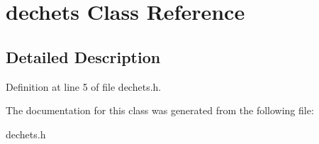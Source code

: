 \hypertarget{classdechets}{}\section{dechets Class Reference}
\label{classdechets}


\subsection{Detailed Description}


Definition at line 5 of file dechets.\+h.



The documentation for this class was generated from the following file\+:\begin{DoxyCompactItemize}
\item 
dechets.\+h\end{DoxyCompactItemize}
